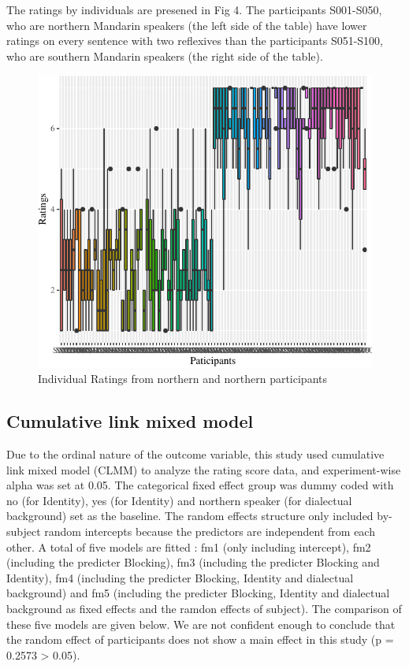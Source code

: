 \documentclass[
  english,
  man,floatsintext]{apa6}
\begin{document}
The ratings by individuals are presened in Fig 4. The participants S001-S050, who are northern Mandarin speakers (the left side of the table) have lower ratings on every sentence with two reflexives than the participants S051-S100, who are southern Mandarin speakers (the right side of the table).

\begin{figure}

{\centering \includegraphics{manuscript_files/figure-latex/plot14-1} 

}

\caption{Individual Ratings from northern and northern participants}\label{fig:plot14}
\end{figure}

\hypertarget{cumulative-link-mixed-model}{%
\subsection{Cumulative link mixed model}\label{cumulative-link-mixed-model}}

Due to the ordinal nature of the outcome variable, this study used cumulative link mixed model (CLMM) to analyze the rating score data, and experiment-wise alpha was set at 0.05. The categorical fixed effect group was dummy coded with no (for Identity), yes (for Identity) and northern speaker (for dialectual background) set as the baseline. The random effects structure only included by-subject random intercepts because the predictors are independent from each other. A total of five models are fitted : fm1 (only including intercept), fm2 (including the predicter Blocking), fm3 (including the predicter Blocking and Identity), fm4 (including the predicter Blocking, Identity and dialectual background) and fm5 (including the predicter Blocking, Identity and dialectual background as fixed effects and the ramdon effects of subject). The comparison of these five models are given below. We are not confident enough to conclude that the random effect of participants does not show a main effect in this study (p = 0.2573 \textgreater{} 0.05).
\end{document}
